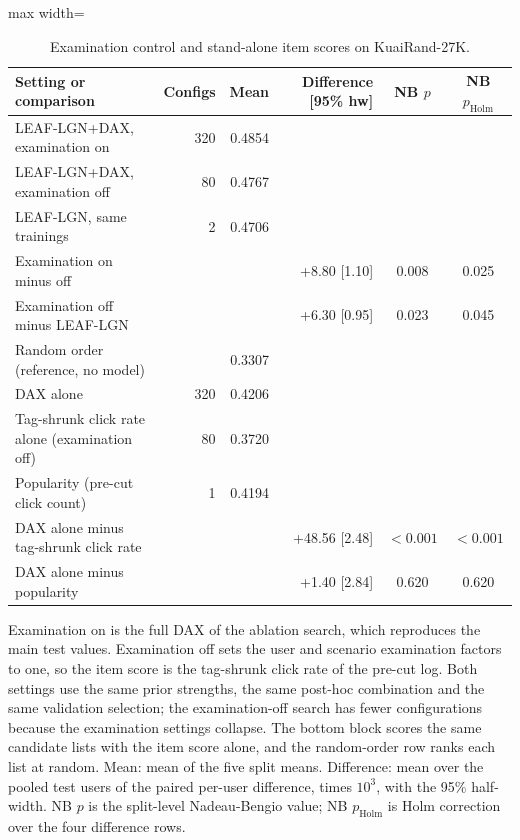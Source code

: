 \begin{table}[tbp]
\centering
\footnotesize
\caption{Examination control and stand-alone item scores on KuaiRand-27K.}
\label{tab:exam}
\begin{adjustbox}{max width=\linewidth}
\begin{tabular}{lrrrcc}
\toprule
Setting or comparison & Configs & Mean & Difference [95\% hw] & NB $p$ & NB $p_{\mathrm{Holm}}$ \\
\midrule
LEAF-LGN+DAX, examination on & 320 & 0.4854 &  &  &  \\
LEAF-LGN+DAX, examination off & 80 & 0.4767 &  &  &  \\
LEAF-LGN, same trainings & 2 & 0.4706 &  &  &  \\
\midrule
Examination on minus off &  &  & +8.80 [1.10] & 0.008 & 0.025 \\
Examination off minus LEAF-LGN &  &  & +6.30 [0.95] & 0.023 & 0.045 \\
\midrule
Random order (reference, no model) &  & 0.3307 &  &  &  \\
DAX alone & 320 & 0.4206 &  &  &  \\
Tag-shrunk click rate alone (examination off) & 80 & 0.3720 &  &  &  \\
Popularity (pre-cut click count) & 1 & 0.4194 &  &  &  \\
\midrule
DAX alone minus tag-shrunk click rate &  &  & +48.56 [2.48] & $<0.001$ & $<0.001$ \\
DAX alone minus popularity &  &  & +1.40 [2.84] & 0.620 & 0.620 \\
\bottomrule
\end{tabular}
\end{adjustbox}
\par\smallskip
\begin{minipage}{\linewidth}\raggedright\footnotesize Examination on is the full DAX of the ablation search, which reproduces the main test values. Examination off sets the user and scenario examination factors to one, so the item score is the tag-shrunk click rate of the pre-cut log. Both settings use the same prior strengths, the same post-hoc combination and the same validation selection; the examination-off search has fewer configurations because the examination settings collapse. The bottom block scores the same candidate lists with the item score alone, and the random-order row ranks each list at random. Mean: mean of the five split means. Difference: mean over the pooled test users of the paired per-user difference, times $10^{3}$, with the 95\% half-width. NB $p$ is the split-level Nadeau-Bengio value; NB $p_{\mathrm{Holm}}$ is Holm correction over the four difference rows.\end{minipage}
\end{table}
